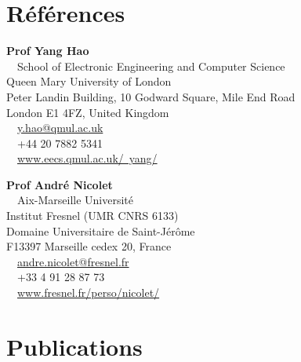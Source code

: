 \documentclass{cv}
\begin{document}
\section{Références}

\begin{minipage}{.6\textwidth}
	\textbf{Prof Yang Hao}\\
	\faHome~~School of Electronic Engineering and Computer Science\\
	Queen Mary University of London\\
	Peter Landin Building, 10 Godward Square, Mile End Road\\
	London E1 4FZ, United Kingdom\\
	\faEnvelope~~\href{mailto:y.hao@qmul.ac.uk}{y.hao@qmul.ac.uk}\\
	\faPhone~~+44 20 7882 5341\\
	\faUser~~\href{http://www.eecs.qmul.ac.uk/~yang/}{www.eecs.qmul.ac.uk/~yang/}
\end{minipage}%
\begin{minipage}{0.4\textwidth}
	\textbf{Prof Andr\'e Nicolet}\\
	\faHome~~Aix-Marseille Université\\
	Institut Fresnel (UMR CNRS 6133)\\
	Domaine Universitaire de Saint-Jérôme\\
	F13397 Marseille cedex 20, France\\
	\faEnvelope~~\href{mailto:andre.nicolet@fresnel.fr}{andre.nicolet@fresnel.fr}\\
	\faPhone~~+33 4 91 28 87 73\\
	\faUser~~\href{https://www.fresnel.fr/perso/nicolet/}{www.fresnel.fr/perso/nicolet/}
\end{minipage}


\vspace*{0.5cm}



\section{Publications}







\end{document}
